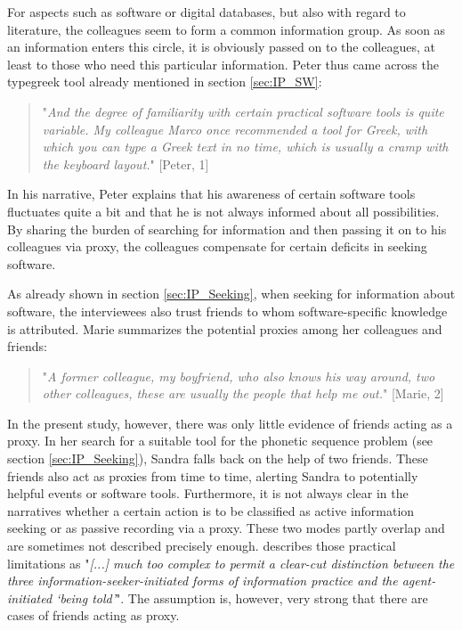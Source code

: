 \documentclass[12pt, a4paper, titlepage, oneside, abstract=true, toc=listof, toc=bibliography, BCOR=1cm]{scrreprt}
\begin{document}
{For aspects such as software or digital databases, but also with regard to literature, the colleagues seem to form a common information group. As soon as an information enters this circle, it is obviously passed on to the colleagues, at least to those who need this particular information. Peter thus came across the typegreek tool already mentioned in section \ref{sec:IP_SW}:

\begin{quotation}
"\textit{And the degree of familiarity with certain practical software tools is quite variable. My colleague Marco once recommended a tool for Greek, with which you can type a Greek text in no time, which is usually a cramp with the keyboard layout.}" [Peter, 1]
\end{quotation}

In his narrative, Peter explains that his awareness of certain software tools fluctuates quite a bit and that he is not always informed about all possibilities. By sharing the burden of searching for information and then passing it on to his colleagues via proxy, the colleagues compensate for certain deficits in seeking software.

As already shown in section \ref{sec:IP_Seeking}, when seeking for information about software, the interviewees also trust friends to whom software-specific knowledge is attributed. Marie summarizes the potential proxies among her colleagues and friends:

\begin{quotation}
"\textit{A former colleague, my boyfriend, who also knows his way around, two other colleagues, these are usually the people that help me out.}" [Marie, 2]
\end{quotation}

In the present study, however, there was only little evidence of friends acting as a proxy. In her search for a suitable tool for the phonetic sequence problem (see section \ref{sec:IP_Seeking}), Sandra falls back on the help of two friends. These friends also act as proxies from time to time, alerting Sandra to potentially helpful events or software tools. Furthermore, it is not always clear in the narratives whether a certain action is to be classified as active information seeking or as passive recording via a proxy. These two modes partly overlap and are sometimes not described precisely enough. \citet[p. 35]{McKenzie2003a} describes those practical limitations as "\textit{[...] much too complex to permit a clear-cut distinction between the three information-seeker-initiated forms of information practice and the agent-initiated `being told’}". The assumption is, however, very strong that there are cases of friends acting as proxy. 

}
\end{document}
